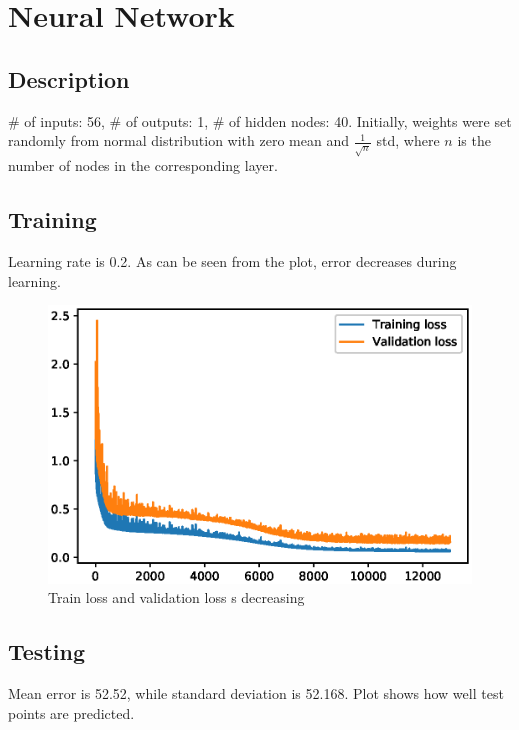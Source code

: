 \documentclass{article}
\begin{document}
\section{Neural Network}

\subsection{Description}

\# of inputs: 56, \# of outputs: 1, \# of hidden nodes: 40. Initially, weights were set randomly from normal distribution with zero mean and $\frac{1}{\sqrt{n}}$ std, where $n$ is the number of nodes in the corresponding layer.

\subsection{Training} 

Learning rate is 0.2. As can be seen from the plot, error decreases during learning.

\begin{figure}
\includegraphics[width=\linewidth]{loss_decrease}
\caption{Train loss and validation loss s decreasing}
\end{figure}

\subsection{Testing}

Mean error is 52.52, while standard deviation is 52.168. Plot shows how well test points are predicted. 
\end{document}
